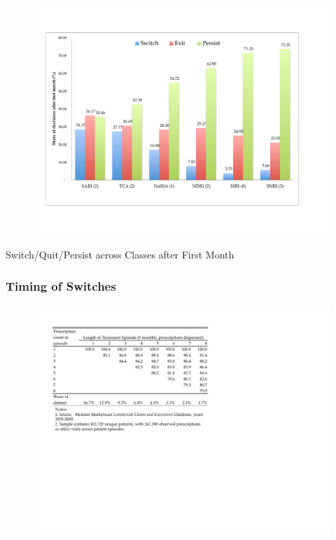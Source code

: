 \documentclass[xcolor=pdftex,dvipsnames,table,mathserif,aspectratio=169]{beamer}
\begin{document}
\begin{frame}[plain]

\begin{figure}[h!]
\centering\includegraphics[width=1\linewidth]{./resources/switch_chart.pdf}
\end{figure}

Switch/Quit/Persist across Classes after First Month
\end{frame}


\begin{frame}
\frametitle{Timing of Switches}

\begin{figure}[h!]
\centering\includegraphics[width=1\linewidth]{./resources/table3_slide.pdf}
\end{figure}
\end{frame}
\end{document}
